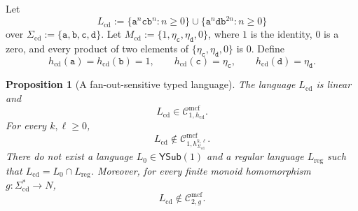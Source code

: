 \documentclass[11pt]{article}
\numberwithin{equation}{section}
\theoremstyle{plain}
\newtheorem{proposition}[theorem]{Proposition}
\theoremstyle{definition}
\theoremstyle{remark}
\newcommand{\Cmcf}[2]{\mathcal{C}^{\mathrm{mcf}}_{#1,#2}}
\newcommand{\YSub}[1]{\mathsf{YSub}(#1)}
\begin{document}
Let
\[
  L_{\mathrm{cd}}:=
  \{\mathtt a^n\mathtt c\mathtt b^n:n\ge0\}
  \cup
  \{\mathtt a^n\mathtt d\mathtt b^{2n}:n\ge0\}
\]
over $\Sigma_{\mathrm{cd}}:=\{\mathtt a,\mathtt b,\mathtt c,\mathtt d\}$.  Let
$M_{\mathrm{cd}}:=\{1,\eta_{\mathtt c},\eta_{\mathtt d},0\}$, where $1$ is the identity, $0$ is a zero,
and every product of two elements of $\{\eta_{\mathtt c},\eta_{\mathtt d},0\}$ is $0$.  Define
\[
 h_{\mathrm{cd}}(\mathtt a)=h_{\mathrm{cd}}(\mathtt b)=1,
 \qquad
 h_{\mathrm{cd}}(\mathtt c)=\eta_{\mathtt c},
 \qquad
 h_{\mathrm{cd}}(\mathtt d)=\eta_{\mathtt d}.
\]

\begin{proposition}[A fan-out-sensitive typed language]
\label{prop:strong-fanout-separation}
The language $L_{\mathrm{cd}}$ is linear and
\[
  L_{\mathrm{cd}}\in\Cmcf{1}{h_{\mathrm{cd}}}.
\]
For every $k,\ell\ge0$,
\[
  L_{\mathrm{cd}}\notin\Cmcf{1}{h_{\Sigma_{\mathrm{cd}}}^{k,\ell}}.
\]
There do not exist a language $L_0\in \YSub{1}$ and a regular language
$L_{\mathrm{reg}}$ such that
$L_{\mathrm{cd}}=L_0\cap L_{\mathrm{reg}}$.  Moreover, for every finite monoid
homomorphism $g:\Sigma_{\mathrm{cd}}^*\to N$,
\[
  L_{\mathrm{cd}}\notin\Cmcf{2}{g}.
\]
\end{proposition}
\end{document}

